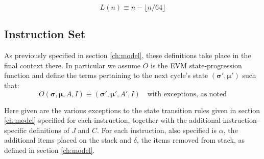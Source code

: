 \documentclass[9pt,oneside]{amsart}
\begin{document}
\begin{equation}
L(n) \equiv n - \lfloor n / 64 \rfloor
\end{equation}

\subsection{Instruction Set}
\label{subsec:instruction-set}

As previously specified in section \ref{ch:model}, these definitions take place in the final context there. In particular we assume $O$ is the EVM state-progression function and define the terms pertaining to the next cycle's state $(\boldsymbol{\sigma}', \boldsymbol{\mu}')$ such that:
\begin{equation}
O(\boldsymbol{\sigma}, \boldsymbol{\mu}, A, I) \equiv (\boldsymbol{\sigma}', \boldsymbol{\mu}', A', I) \quad \text{with exceptions, as noted}
\end{equation}

Here given are the various exceptions to the state transition rules given in section \ref{ch:model} specified for each instruction, together with the additional instruction-specific definitions of $J$ and $C$. For each instruction, also specified is $\alpha$, the additional items placed on the stack and $\delta$, the items removed from stack, as defined in section \ref{ch:model}.
\end{document}
